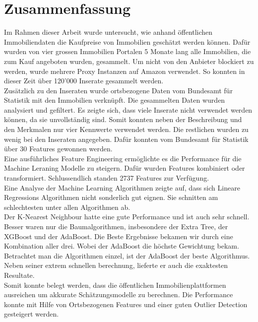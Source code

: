 \section{Zusammenfassung}
Im Rahmen dieser Arbeit wurde untersucht, wie anhand öffentlichen Immobiliendaten die Kaufpreise von Immobilien geschätzt werden können. Dafür wurden von vier grossen Immobilien Portalen 5 Monate lang alle Immobilien, die zum Kauf angeboten wurden, gesammelt. Um nicht von den Anbieter blockiert zu werden, wurde mehrere Proxy Instanzen auf Amazon verwendet. So konnten in dieser Zeit über 120’000 Inserate gesammelt werden.\\
Zusätzlich zu den Inseraten wurde ortsbezogene Daten vom Bundesamt für Statistik mit den Immobilien verknüpft.
Die gesammelten Daten wurden analysiert und gefiltert. Es zeigte sich, dass viele Inserate nicht verwendet werden können, da sie unvollständig sind. Somit konnten neben der Beschreibung und den Merkmalen nur vier Kennwerte verwendet werden. Die restlichen wurden zu wenig bei den Inseraten angegeben. Dafür konnten vom Bundesamt für Statistik über 30 Features gewonnen werden.\\
Eine ausführliches Feature Engineering ermöglichte es die Performance für die Machine Leraning Modelle zu steigern. Dafür wurden Features kombiniert oder transformiert. Schlussendlich standen 2737 Features zur Verfügung.\\
Eine Analyse der Machine Learning Algorithmen zeigte auf, dass sich Lineare Regressions Algorithmen nicht sonderlich gut eignen. Sie schnitten am schlechtesten unter allen Algorithmen ab.\\
Der K-Nearest Neighbour hatte eine gute Performance und ist auch sehr schnell. Besser waren nur die Baumalgorithmen, insbesondere der Extra Tree, der XGBoost und der AdaBoost. Die Beste Ergebnisse bekamen wir durch eine Kombination aller drei. Wobei der AdaBoost die höchste Gewichtung bekam.\\
Betrachtet man die Algorithmen einzel, ist der AdaBoost der beste Algorithmus. Neben seiner extrem schnellen berechnung, lieferte er auch die exaktesten Resultate.\\[2ex]

Somit konnte belegt werden, dass die öffentlichen Immobilienplattformen ausreichen um akkurate Schätzungsmodelle zu berechnen. Die Performance konnte mit Hilfe von Ortsbezogenen Features und einer guten Outlier Detection gesteigert werden.
